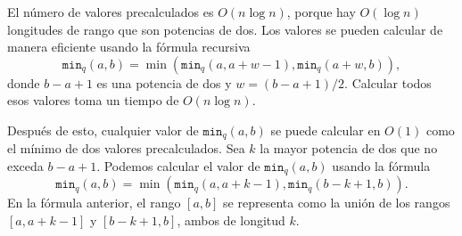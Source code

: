 El número de valores precalculados es $O(n \log n)$,
porque hay $O(\log n)$ longitudes de rango
que son potencias de dos.
Los valores se pueden calcular de manera eficiente
usando la fórmula recursiva
\[\texttt{min}_q(a,b) = \min(\texttt{min}_q(a,a+w-1),\texttt{min}_q(a+w,b)),\]
donde $b-a+1$ es una potencia de dos y $w=(b-a+1)/2$.
Calcular todos esos valores toma un tiempo de $O(n \log n)$.

Después de esto, cualquier valor de $\texttt{min}_q(a,b)$ se puede calcular
en  $O(1)$ como el mínimo de dos valores precalculados.
Sea $k$ la mayor potencia de dos que no exceda $b-a+1$.
Podemos calcular el valor de $\texttt{min}_q(a,b)$ usando la fórmula
\[\texttt{min}_q(a,b) = \min(\texttt{min}_q(a,a+k-1),\texttt{min}_q(b-k+1,b)).\]
En la fórmula anterior, el rango $[a,b]$ se representa
como la unión de los rangos $[a,a+k-1]$ y $[b-k+1,b]$, ambos de longitud $k$.

